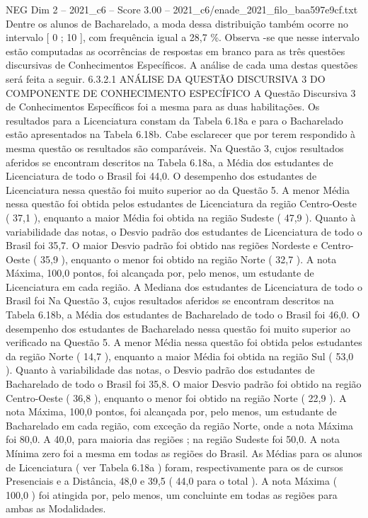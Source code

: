 \begin{textsample}{NEG Dim 2 – 2021\_c6 – Score 3.00 – 2021\_c6/enade\_2021\_filo\_baa597e9cf.txt}
Dentre os alunos de Bacharelado, a moda dessa distribuição também ocorre no intervalo [ 0 ; 10 ], com frequência igual a 28,7 \%.
Observa -se que nesse intervalo estão computadas as ocorrências de respostas em branco para as três questões discursivas de Conhecimentos Específicos.
A análise de cada uma destas questões será feita a seguir. 6.3.2.1 ANÁLISE DA QUESTÃO DISCURSIVA 3 DO COMPONENTE DE CONHECIMENTO ESPECÍFICO A Questão Discursiva 3 de Conhecimentos Específicos foi a mesma para as duas habilitações.
Os resultados para a Licenciatura constam da Tabela 6.18a e para o Bacharelado estão apresentados na Tabela 6.18b.
Cabe esclarecer que por terem respondido à mesma questão os resultados são comparáveis.
Na Questão 3, cujos resultados aferidos se encontram descritos na Tabela 6.18a, a Média dos estudantes de Licenciatura de todo o Brasil foi 44,0.
O desempenho dos estudantes de Licenciatura nessa questão foi muito superior ao da Questão 5.
A menor Média nessa questão foi obtida pelos estudantes de Licenciatura da região Centro-Oeste ( 37,1 ), enquanto a maior Média foi obtida na região Sudeste ( 47,9 ).
Quanto à variabilidade das notas, o Desvio padrão dos estudantes de Licenciatura de todo o Brasil foi 35,7.
O maior Desvio padrão foi obtido nas regiões Nordeste e Centro-Oeste ( 35,9 ), enquanto o menor foi obtido na região Norte ( 32,7 ).
A nota Máxima, 100,0 pontos, foi alcançada por, pelo menos, um estudante de Licenciatura em cada região.
A Mediana dos estudantes de Licenciatura de todo o Brasil foi Na Questão 3, cujos resultados aferidos se encontram descritos na Tabela 6.18b, a Média dos estudantes de Bacharelado de todo o Brasil foi 46,0.
O desempenho dos estudantes de Bacharelado nessa questão foi muito superior ao verificado na Questão 5.
A menor Média nessa questão foi obtida pelos estudantes da região Norte ( 14,7 ), enquanto a maior Média foi obtida na região Sul ( 53,0 ).
Quanto à variabilidade das notas, o Desvio padrão dos estudantes de Bacharelado de todo o Brasil foi 35,8.
O maior Desvio padrão foi obtido na região Centro-Oeste ( 36,8 ), enquanto o menor foi obtido na região Norte ( 22,9 ).
A nota Máxima, 100,0 pontos, foi alcançada por, pelo menos, um estudante de Bacharelado em cada região, com exceção da região Norte, onde a nota Máxima foi 80,0.
A 40,0, para maioria das regiões ; na região Sudeste foi 50,0.
A nota Mínima zero foi a mesma em todas as regiões do Brasil.
As Médias para os alunos de Licenciatura ( ver Tabela 6.18a ) foram, respectivamente para os de cursos Presenciais e a Distância, 48,0 e 39,5 ( 44,0 para o total ).
A nota Máxima ( 100,0 ) foi atingida por, pelo menos, um concluinte em todas as regiões para ambas as Modalidades.

\end{textsample}
